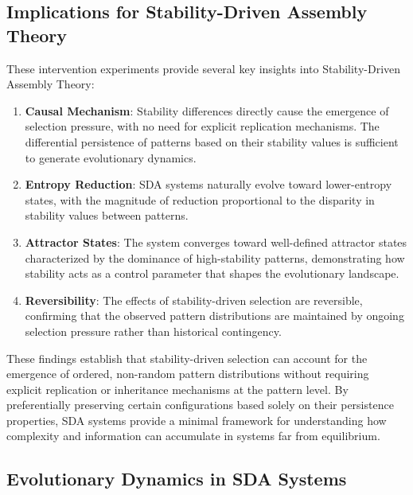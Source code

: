 \documentclass[preprint,12pt]{elsarticle}
\begin{document}
\subsection{Implications for Stability-Driven Assembly Theory}
\label{subsec:implications}

These intervention experiments provide several key insights into Stability-Driven Assembly Theory:

\begin{enumerate}
    \item \textbf{Causal Mechanism}: Stability differences directly cause the emergence of selection pressure, with no need for explicit replication mechanisms. The differential persistence of patterns based on their stability values is sufficient to generate evolutionary dynamics.
    
    \item \textbf{Entropy Reduction}: SDA systems naturally evolve toward lower-entropy states, with the magnitude of reduction proportional to the disparity in stability values between patterns.
    
    \item \textbf{Attractor States}: The system converges toward well-defined attractor states characterized by the dominance of high-stability patterns, demonstrating how stability acts as a control parameter that shapes the evolutionary landscape.
    
    \item \textbf{Reversibility}: The effects of stability-driven selection are reversible, confirming that the observed pattern distributions are maintained by ongoing selection pressure rather than historical contingency.
\end{enumerate}

These findings establish that stability-driven selection can account for the emergence of ordered, non-random pattern distributions without requiring explicit replication or inheritance mechanisms at the pattern level. By preferentially preserving certain configurations based solely on their persistence properties, SDA systems provide a minimal framework for understanding how complexity and information can accumulate in systems far from equilibrium.


\subsection{Evolutionary Dynamics in SDA Systems}
\label{subsec:evolutionary-dynamics}
\end{document}
